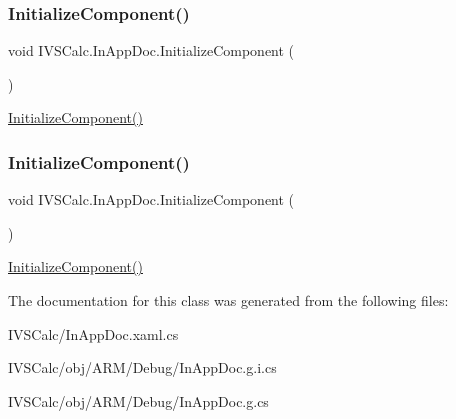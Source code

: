 \subsubsection{\texorpdfstring{Initialize\+Component()}{InitializeComponent()}\hspace{0.1cm}{\footnotesize\ttfamily [4/5]}}
{\footnotesize\ttfamily void I\+V\+S\+Calc.\+In\+App\+Doc.\+Initialize\+Component (\begin{DoxyParamCaption}{ }\end{DoxyParamCaption})}



\hyperlink{class_i_v_s_calc_1_1_in_app_doc_aaea69e2cf03d01b3fcd38f048dbeb569}{Initialize\+Component()} 

\mbox{\label{class_i_v_s_calc_1_1_in_app_doc_aaea69e2cf03d01b3fcd38f048dbeb569}} 
\subsubsection{\texorpdfstring{Initialize\+Component()}{InitializeComponent()}\hspace{0.1cm}{\footnotesize\ttfamily [5/5]}}
{\footnotesize\ttfamily void I\+V\+S\+Calc.\+In\+App\+Doc.\+Initialize\+Component (\begin{DoxyParamCaption}{ }\end{DoxyParamCaption})}



\hyperlink{class_i_v_s_calc_1_1_in_app_doc_aaea69e2cf03d01b3fcd38f048dbeb569}{Initialize\+Component()} 



The documentation for this class was generated from the following files\+:\begin{DoxyCompactItemize}
\item 
I\+V\+S\+Calc/In\+App\+Doc.\+xaml.\+cs\item 
I\+V\+S\+Calc/obj/\+A\+R\+M/\+Debug/In\+App\+Doc.\+g.\+i.\+cs\item 
I\+V\+S\+Calc/obj/\+A\+R\+M/\+Debug/In\+App\+Doc.\+g.\+cs\end{DoxyCompactItemize}
